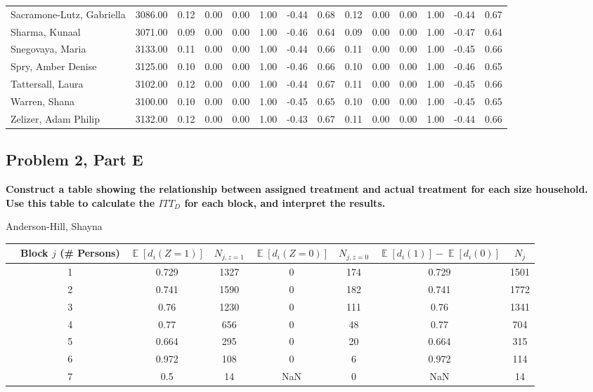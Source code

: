 \documentclass[11pt,notitlepage]{article}
\def\E{\mathop{\mathbb{E}}}
\begin{document}
\begin{table}[h!]
\begin{center}
\begin{tabular}{lrrrrrrr|rrrrrr}
  Sacramone-Lutz, Gabriella & 3086.00 & 0.12 & 0.00 & 0.00 & 1.00 & -0.44 & 0.68 & 0.12 & 0.00 & 0.00 & 1.00 & -0.44 & 0.67 \\ 
  Sharma, Kunaal & 3071.00 & 0.09 & 0.00 & 0.00 & 1.00 & -0.46 & 0.64 & 0.09 & 0.00 & 0.00 & 1.00 & -0.47 & 0.64 \\ 
  Snegovaya, Maria & 3133.00 & 0.11 & 0.00 & 0.00 & 1.00 & -0.44 & 0.66 & 0.11 & 0.00 & 0.00 & 1.00 & -0.45 & 0.66 \\ 
  Spry, Amber Denise & 3125.00 & 0.10 & 0.00 & 0.00 & 1.00 & -0.46 & 0.66 & 0.10 & 0.00 & 0.00 & 1.00 & -0.46 & 0.65 \\ 
  Tattersall, Laura & 3102.00 & 0.12 & 0.00 & 0.00 & 1.00 & -0.44 & 0.67 & 0.11 & 0.00 & 0.00 & 1.00 & -0.45 & 0.66 \\ 
  Warren, Shana & 3100.00 & 0.10 & 0.00 & 0.00 & 1.00 & -0.45 & 0.65 & 0.10 & 0.00 & 0.00 & 1.00 & -0.45 & 0.65 \\ 
  Zelizer, Adam Philip & 3132.00 & 0.12 & 0.00 & 0.00 & 1.00 & -0.43 & 0.67 & 0.11 & 0.00 & 0.00 & 1.00 & -0.44 & 0.66 \\ 
   \hline
\end{tabular}
\end{center}
\end{table}

\clearpage

\subsection{Problem 2, Part E} {\bf Construct a table showing the relationship between assigned treatment and actual treatment for each size household.  Use this table to calculate the $ITT_D$ for each block, and interpret the results.}

\vspace{1cm}

Anderson-Hill, Shayna
\begin{table}[h!]\small
\begin{center}
\begin{tabular}{rc|cc|cc|cc}
  \hline
 & Block $j$ (\# Persons) & $\E[d_i(Z=1)]$ & $N_{j, z=1}$ & $\E[d_i(Z=0)]$ & $N_{j, z=0}$ & $\E[d_i(1)]-\E[d_i(0)]$ & $N_j$ \\ 
  \hline
 & 1 & 0.729 & 1327 & 0 & 174 & 0.729 & 1501 \\ 
 & 2 & 0.741 & 1590 & 0 & 182 & 0.741 & 1772 \\ 
 & 3 & 0.76 & 1230 & 0 & 111 & 0.76 & 1341 \\ 
 & 4 & 0.77 & 656 & 0 & 48 & 0.77 & 704 \\ 
 & 5 & 0.664 & 295 & 0 & 20 & 0.664 & 315 \\ 
 & 6 & 0.972 & 108 & 0 & 6 & 0.972 & 114 \\ 
 & 7 & 0.5 & 14 & NaN & 0 & NaN & 14 \\ 
   \hline
\end{tabular}
\end{center}
\end{table}
\end{document}

